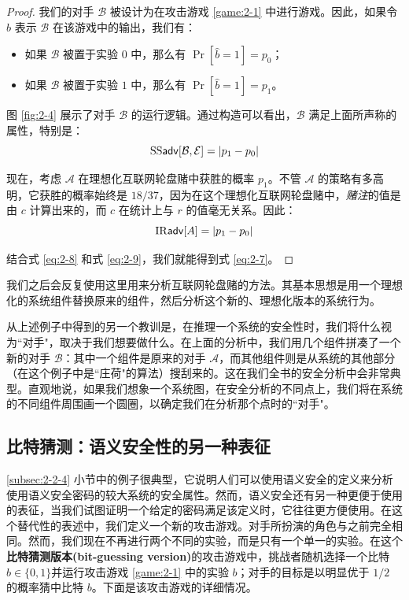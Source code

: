 \begin{proof}
我们的对手 $\mathcal{B}$ 被设计为在攻击游戏 \ref{game:2-1} 中进行游戏。因此，如果令 $\hat b$ 表示 $\mathcal{B}$ 在该游戏中的输出，我们有：
\begin{itemize}
	\item 如果 $\mathcal{B}$ 被置于实验 $0$ 中，那么有 $\Pr[\hat b=1]=p_0$；
	\item 如果 $\mathcal{B}$ 被置于实验 $1$ 中，那么有 $\Pr[\hat b=1]=p_1$。
\end{itemize}
图 \ref{fig:2-4} 展示了对手 $\mathcal{B}$ 的运行逻辑。通过构造可以看出，$\mathcal{B}$ 满足上面所声称的属性，特别是：
\begin{equation}\label{eq:2-8}
{\rm SS\mathsf{adv}}[\mathcal{B},\mathcal{E}]=|p_1-p_0|
\end{equation}

现在，考虑 $\mathcal{A}$ 在理想化互联网轮盘赌中获胜的概率 $p_1$。不管 $\mathcal{A}$ 的策略有多高明，它获胜的概率始终是 $18/37$，因为在这个理想化互联网轮盘赌中，\emph{赌注}的值是由 $c$ 计算出来的，而 $c$ 在统计上与 $r$ 的值毫无关系。因此：
\begin{equation}\label{eq:2-9}
{\rm IR\mathsf{adv}}[A]=|p_1-p_0|
\end{equation}

结合式 \ref{eq:2-8} 和式 \ref{eq:2-9}，我们就能得到式 \ref{eq:2-7}。
\end{proof}

我们之后会反复使用这里用来分析互联网轮盘赌的方法。其基本思想是用一个理想化的系统组件替换原来的组件，然后分析这个新的、理想化版本的系统行为。

从上述例子中得到的另一个教训是，在推理一个系统的安全性时，我们将什么视为``对手"，取决于我们想要做什么。在上面的分析中，我们用几个组件拼凑了一个新的对手 $\mathcal{B}$：其中一个组件是原来的对手 $\mathcal{A}$，而其他组件则是从系统的其他部分（在这个例子中是``庄荷"的算法）搜刮来的。这在我们全书的安全分析中会非常典型。直观地说，如果我们想象一个系统图，在安全分析的不同点上，我们将在系统的不同组件周围画一个圆圈，以确定我们在分析那个点时的``对手"。

\subsection{比特猜测：语义安全性的另一种表征}\label{subsec:2-2-5}

\ref{subsec:2-2-4} 小节中的例子很典型，它说明人们可以使用语义安全的定义来分析使用语义安全密码的较大系统的安全属性。然而，语义安全还有另一种更便于使用的表征，当我们试图证明一个给定的密码满足该定义时，它往往更方便使用。在这个替代性的表述中，我们定义一个新的攻击游戏。对手所扮演的角色与之前完全相同。然而，我们现在不再进行两个不同的实验，而是只有一个单一的实验。在这个\textbf{比特猜测版本(bit-guessing version)}的攻击游戏中，挑战者随机选择一个比特 $b\in\{0,1\}$并运行攻击游戏 \ref{game:2-1} 中的实验 $b$；对手的目标是以明显优于 ${1}/{2}$ 的概率猜中比特 $b$。下面是该攻击游戏的详细情况。

